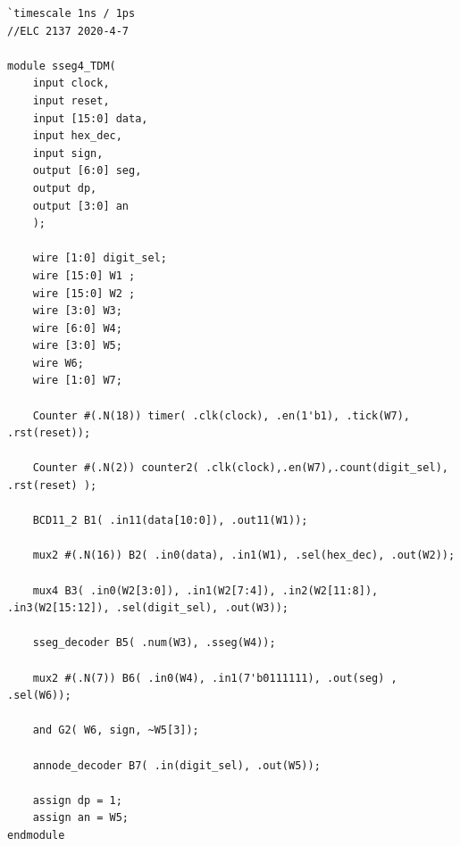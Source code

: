 \documentclass[11pt]{article}
\begin{document}
\begin{lstlisting}[style=Verilog,
caption=sseg4TDM Module,
label=sseg4TDM
]
`timescale 1ns / 1ps
//ELC 2137 2020-4-7

module sseg4_TDM(
	input clock,
	input reset,
	input [15:0] data,
	input hex_dec,
	input sign,
	output [6:0] seg,
	output dp,
	output [3:0] an
	);
	
	wire [1:0] digit_sel;    
	wire [15:0] W1 ;
	wire [15:0] W2 ;
	wire [3:0] W3;
	wire [6:0] W4;
	wire [3:0] W5;
	wire W6;    
	wire [1:0] W7;

	Counter #(.N(18)) timer( .clk(clock), .en(1'b1), .tick(W7), .rst(reset));  
	
	Counter #(.N(2)) counter2( .clk(clock),.en(W7),.count(digit_sel), .rst(reset) );   
	  
	BCD11_2 B1( .in11(data[10:0]), .out11(W1));
	
	mux2 #(.N(16)) B2( .in0(data), .in1(W1), .sel(hex_dec), .out(W2));
	
	mux4 B3( .in0(W2[3:0]), .in1(W2[7:4]), .in2(W2[11:8]), .in3(W2[15:12]), .sel(digit_sel), .out(W3));
	
	sseg_decoder B5( .num(W3), .sseg(W4));
	
	mux2 #(.N(7)) B6( .in0(W4), .in1(7'b0111111), .out(seg) , .sel(W6));
	
	and G2( W6, sign, ~W5[3]);
	
	annode_decoder B7( .in(digit_sel), .out(W5));

	assign dp = 1;
	assign an = W5;
endmodule


\end{lstlisting}
\end{document}
